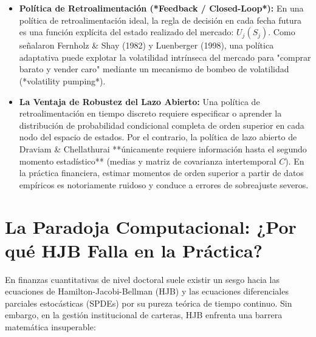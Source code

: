 \documentclass[11pt,a4paper]{report}
\numberwithin{equation}{chapter}
\begin{document}
\begin{itemize}[leftmargin=2em]
    \item \textbf{Política de Retroalimentación (*Feedback / Closed-Loop*):} En una política de retroalimentación ideal, la regla de decisión en cada fecha futura es una función explícita del estado realizado del mercado: $U_j(S_j)$. Como señalaron Fernholz \& Shay (1982) y Luenberger (1998), una política adaptativa puede explotar la volatilidad intrínseca del mercado para "comprar barato y vender caro" mediante un mecanismo de bombeo de volatilidad (*volatility pumping*).
    \item \textbf{La Ventaja de Robustez del Lazo Abierto:} Una política de retroalimentación en tiempo discreto requiere especificar o aprender la distribución de probabilidad condicional completa de orden superior en cada nodo del espacio de estados. Por el contrario, la política de lazo abierto de Draviam \& Chellathurai **únicamente requiere información hasta el segundo momento estadístico** (medias y matriz de covarianza intertemporal $C$). En la práctica financiera, estimar momentos de orden superior a partir de datos empíricos es notoriamente ruidoso y conduce a errores de sobreajuste severos.
\end{itemize}

\section{La Paradoja Computacional: ¿Por qué HJB Falla en la Práctica?}

En finanzas cuantitativas de nivel doctoral suele existir un sesgo hacia las ecuaciones de Hamilton-Jacobi-Bellman (HJB) y las ecuaciones diferenciales parciales estocásticas (SPDEs) por su pureza teórica de tiempo continuo. Sin embargo, en la gestión institucional de carteras, HJB enfrenta una barrera matemática insuperable:
\end{document}
